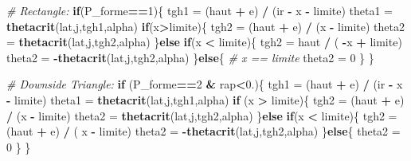 \documentclass[]{book}
\newenvironment{Shaded}{\begin{snugshade}}{\end{snugshade}}
\newcommand{\KeywordTok}[1]{\textcolor[rgb]{0.13,0.29,0.53}{\textbf{#1}}}
\newcommand{\DecValTok}[1]{\textcolor[rgb]{0.00,0.00,0.81}{#1}}
\newcommand{\StringTok}[1]{\textcolor[rgb]{0.31,0.60,0.02}{#1}}
\newcommand{\CommentTok}[1]{\textcolor[rgb]{0.56,0.35,0.01}{\textit{#1}}}
\newcommand{\ControlFlowTok}[1]{\textcolor[rgb]{0.13,0.29,0.53}{\textbf{#1}}}
\newcommand{\OperatorTok}[1]{\textcolor[rgb]{0.81,0.36,0.00}{\textbf{#1}}}
\newcommand{\NormalTok}[1]{#1}
\theoremstyle{definition}
\theoremstyle{definition}
\theoremstyle{definition}
\theoremstyle{remark}
\begin{document}
\begin{Shaded}
\begin{Highlighting}[]
  \CommentTok{# Rectangle:}
  \ControlFlowTok{if}\NormalTok{(P_forme}\OperatorTok{==}\DecValTok{1}\NormalTok{)\{}
\NormalTok{    tgh1 =}\StringTok{ }\NormalTok{(haut }\OperatorTok{+}\StringTok{ }\NormalTok{e) }\OperatorTok{/}\StringTok{ }\NormalTok{(ir }\OperatorTok{-}\StringTok{ }\NormalTok{x }\OperatorTok{-}\StringTok{ }\NormalTok{limite)}
\NormalTok{    theta1 =}\StringTok{ }\KeywordTok{thetacrit}\NormalTok{(lat,j,tgh1,alpha)}
    \ControlFlowTok{if}\NormalTok{(x}\OperatorTok{>}\NormalTok{limite)\{}
\NormalTok{      tgh2 =}\StringTok{ }\NormalTok{(haut }\OperatorTok{+}\StringTok{ }\NormalTok{e) }\OperatorTok{/}\StringTok{ }\NormalTok{(x }\OperatorTok{-}\StringTok{ }\NormalTok{limite)}
\NormalTok{      theta2 =}\StringTok{ }\KeywordTok{thetacrit}\NormalTok{(lat,j,tgh2,alpha)}
\NormalTok{    \}}\ControlFlowTok{else} \ControlFlowTok{if}\NormalTok{(x }\OperatorTok{<}\StringTok{ }\NormalTok{limite)\{}
\NormalTok{      tgh2 =}\StringTok{ }\NormalTok{haut }\OperatorTok{/}\StringTok{ }\NormalTok{( }\OperatorTok{-}\NormalTok{x }\OperatorTok{+}\StringTok{ }\NormalTok{limite)}
\NormalTok{      theta2 =}\StringTok{ }\OperatorTok{-}\KeywordTok{thetacrit}\NormalTok{(lat,j,tgh2,alpha)}
\NormalTok{    \}}\ControlFlowTok{else}\NormalTok{\{}
      \CommentTok{# x == limite}
\NormalTok{      theta2 =}\StringTok{ }\DecValTok{0}
\NormalTok{    \}}
\NormalTok{  \}}
  
  \CommentTok{# Downside Triangle:}
  \ControlFlowTok{if}\NormalTok{ (P_forme}\OperatorTok{==}\DecValTok{2} \OperatorTok{&}\StringTok{ }\NormalTok{rap}\OperatorTok{<}\DecValTok{0}\NormalTok{.)\{}
\NormalTok{    tgh1 =}\StringTok{ }\NormalTok{(haut }\OperatorTok{+}\StringTok{ }\NormalTok{e) }\OperatorTok{/}\StringTok{ }\NormalTok{(ir }\OperatorTok{-}\StringTok{ }\NormalTok{x }\OperatorTok{-}\StringTok{ }\NormalTok{limite)}
\NormalTok{    theta1 =}\StringTok{ }\KeywordTok{thetacrit}\NormalTok{(lat,j,tgh1,alpha)}
    \ControlFlowTok{if}\NormalTok{ (x }\OperatorTok{>}\StringTok{ }\NormalTok{limite)\{}
\NormalTok{      tgh2 =}\StringTok{ }\NormalTok{(haut }\OperatorTok{+}\StringTok{ }\NormalTok{e) }\OperatorTok{/}\StringTok{ }\NormalTok{(x }\OperatorTok{-}\StringTok{ }\NormalTok{limite)}
\NormalTok{      theta2 =}\StringTok{ }\KeywordTok{thetacrit}\NormalTok{(lat,j,tgh2,alpha)}
\NormalTok{    \}}\ControlFlowTok{else} \ControlFlowTok{if}\NormalTok{(x }\OperatorTok{<}\StringTok{ }\NormalTok{limite)\{}
\NormalTok{      tgh2 =}\StringTok{ }\NormalTok{(haut }\OperatorTok{+}\StringTok{ }\NormalTok{e) }\OperatorTok{/}\StringTok{ }\NormalTok{( x }\OperatorTok{-}\StringTok{ }\NormalTok{limite)}
\NormalTok{      theta2 =}\StringTok{ }\OperatorTok{-}\KeywordTok{thetacrit}\NormalTok{(lat,j,tgh2,alpha)}
\NormalTok{    \}}\ControlFlowTok{else}\NormalTok{\{}
\NormalTok{      theta2 =}\StringTok{ }\DecValTok{0}
\NormalTok{    \}}
\NormalTok{  \}}
  

\end{Highlighting}
\end{Shaded}
\end{document}

